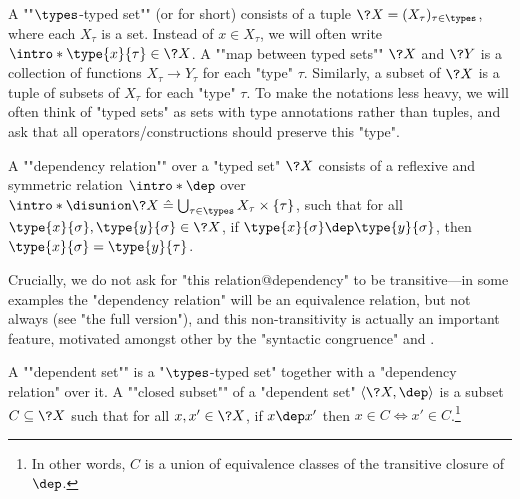 A \AP""$\types$-typed set"" (or  for short) consists of
a tuple $\?X = (X_\tau)_{\tau \in \types}$, where each $X_\tau$ is a set.
Instead of $x \in X_\tau$, we will often write \AP$\intro*\type{x}{\tau} \in \?X$.
A \AP""map between typed sets"" $\?X$ and $\?Y$ is a collection of functions
$X_\tau \to Y_\tau$ for each "type" $\tau$.
Similarly, a subset of $\?X$ is a tuple of subsets of $X_\tau$ for each "type" $\tau$.
To make the notations less heavy, we will often think of
"typed sets" as sets with type annotations rather than tuples, and ask that
all operators/constructions should preserve this "type".

\begin{definition}
	\label{def:dependency}
	A \AP""dependency relation"" over a "typed set" $\?X$ consists of
	a reflexive and symmetric relation $\intro*\dep$ over
	\AP$\intro*\disunion \?X \defeq \bigcup_{\tau \in \types} X_\tau \times \{\tau\}$,
	such that for all $\type{x}{\sigma}, \type{y}{\sigma} \in \?X$,
	if $\type{x}{\sigma} \dep \type{y}{\sigma}$,
	then $\type{x}{\sigma} = \type{y}{\tau}$.

	Crucially, we do not ask for "this relation@dependency" to be transitive---in some examples the "dependency relation" will be an equivalence relation, but not always (see "the full version"), and
	this non-transitivity is actually an important feature, motivated amongst other by the
	"syntactic congruence" and .

	A \AP""dependent set"" is a "$\types$-typed set" together with a
	"dependency relation" over it. A \AP""closed subset"" of a "dependent set" $\langle \?X, \dep \rangle$ is a subset $C \subseteq \?X$ such that for all
	$x, x' \in \?X$, if $x \dep x'$ then $x \in C \iff x' \in C$.\footnote{In other
	words, $C$ is a union of equivalence classes of the transitive closure of $\dep$.}
\end{definition}

